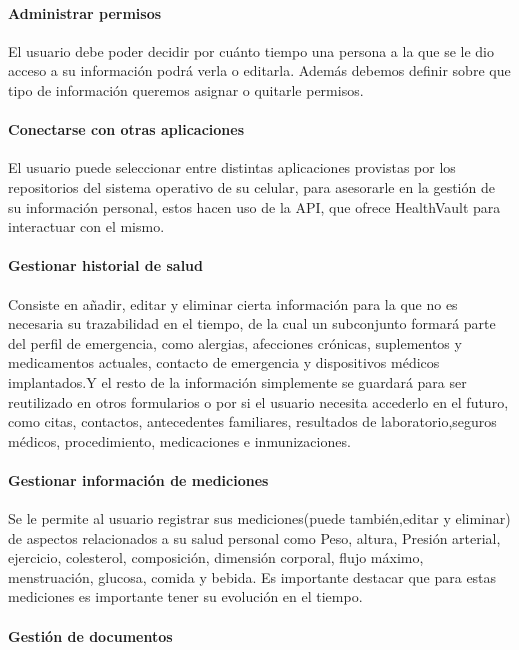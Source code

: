 \paragraph{Administrar permisos}

El usuario debe poder decidir por cuánto tiempo una persona a la que se le dio acceso a su información podrá verla o editarla. Además debemos definir sobre que tipo de información queremos asignar o quitarle permisos.

\paragraph{Conectarse con otras aplicaciones}

El usuario puede seleccionar entre distintas aplicaciones provistas por los repositorios del sistema operativo de su celular, para asesorarle en la gestión de su información personal, estos hacen uso de la API, que ofrece HealthVault para interactuar con el mismo.

\paragraph{Gestionar historial de salud}

Consiste en añadir, editar y eliminar cierta información para la que no es necesaria su trazabilidad en el tiempo, de la cual un subconjunto formará parte del perfil de emergencia, como alergias, afecciones crónicas, suplementos y medicamentos actuales, contacto de emergencia y dispositivos médicos implantados.Y el resto de la información simplemente se guardará para ser reutilizado en otros formularios o por si el usuario necesita accederlo en el futuro, como citas, contactos, antecedentes familiares, resultados de laboratorio,seguros médicos, procedimiento, medicaciones e inmunizaciones.
 
\paragraph{Gestionar información de mediciones}

Se le permite al usuario registrar sus mediciones(puede también,editar y eliminar) de aspectos relacionados a su salud personal como Peso, altura, Presión arterial, ejercicio, colesterol, composición, dimensión corporal, flujo máximo, menstruación, glucosa, comida y bebida. Es importante destacar que para estas mediciones es importante tener su evolución en el tiempo.

\paragraph{Gestión de documentos}

